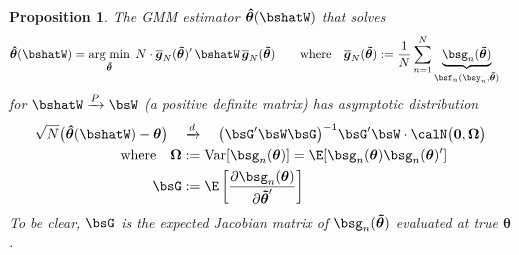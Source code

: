 \documentclass[12pt]{article}
\theoremstyle{plain}
\newtheorem{prop}[thm]{Proposition}
\theoremstyle{definition}
\theoremstyle{remark}
\newcommand{\bstheta}{\boldsymbol{\theta}}
\newcommand{\bsOmega}{\boldsymbol{\Omega}}
\newcommand{\bshattheta}{\boldsymbol{\hat{\theta}}}
\newcommand{\bstildetheta}{\boldsymbol{\tilde{\theta}}}
\newcommand{\bsbarg}{\boldsymbol{\overline{g}}}
\renewcommand{\bso}{\boldsymbol{0}}
\DeclareMathOperator*{\argmin}{arg\;min}
\newcommand{\Var}{\operatorname{Var}}
\newcommand{\pto}{\xrightarrow{P}}
\newcommand{\dto}{\xrightarrow{d}}
\newcommand{\sumnN}{\sum^N_{n=1}}
\begin{document}
\begin{prop}
The GMM estimator $\bshattheta(\bshatW)$ that solves
\begin{align*}
  \bshattheta(\bshatW)
  &=
  \argmin_{\bstildetheta}\;
  N \cdot \bsbarg_N(\bstildetheta)' \,\bshatW \,\bsbarg_N(\bstildetheta)
  \qquad
  \text{where}\quad
  \bsbarg_N(\bstildetheta)
  := \frac{1}{N}\sumnN
  \underbrace{\bsg_n(\bstildetheta)}_{\bsf_n(\bsy_n,\bstildetheta)}
\end{align*}
for $\bshatW\pto\bsW$ (a positive definite matrix)
has asymptotic distribution
\begin{align*}
  \sqrt{N}\big(\bshattheta(\bshatW)-\bstheta\big)
  \quad&\dto\quad
  \big( \bsG' \bsW \bsG \big)^{-1}
  \bsG' \bsW
  \cdot
  \calN\big(\bso,\bsOmega\big)
  \\
  \text{where}\quad
  \bsOmega &:= \Var[\bsg_n(\bstheta)]
  = \E[\bsg_n(\bstheta)\bsg_n(\bstheta)']
  \\
  \bsG &:= \E\left[
    \frac{\partial \bsg_n(\bstheta)}{\partial \bstildetheta'}
  \right]
\end{align*}
To be clear, $\bsG$ is the expected Jacobian matrix of
$\bsg_n(\bstildetheta)$ evaluated at true $\bstheta$.
\end{prop}
\end{document}
